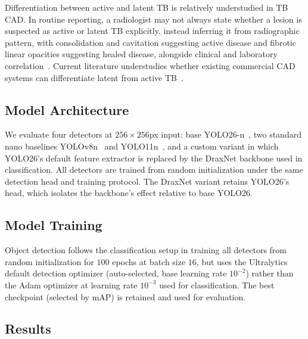 \documentclass[conference, letterpaper]{IEEEtran}
\begin{document}
Differentiation between active and latent TB is relatively understudied in TB CAD. In routine reporting, a radiologist may not always state whether a lesion is suspected as active or latent TB explicitly, instead inferring it from radiographic pattern, with consolidation and cavitation suggesting active disease and fibrotic linear opacities suggesting healed disease, alongside clinical and laboratory correlation~\cite{burrill2007tb_radiology}. Current literature understudies whether existing commercial CAD systems can differentiate latent from active TB~\cite{stoptb_cad_guide}.

\subsection{Model Architecture}

We evaluate four detectors at $256\times256$px input: base YOLO26-n~\cite{yolo26}, two standard nano baselines YOLOv8n~\cite{yolov8} and YOLO11n~\cite{yolo11}, and a custom variant in which YOLO26's default feature extractor is replaced by the DraxNet backbone used in classification. All detectors are trained from random initialization under the same detection head and training protocol. The DraxNet variant retains YOLO26's head, which isolates the backbone's effect relative to base YOLO26.

\subsection{Model Training}

Object detection follows the classification setup in training all detectors from random initialization for $100$ epochs at batch size $16$, but uses the Ultralytics default detection optimizer (auto-selected, base learning rate $10^{-2}$) rather than the Adam optimizer at learning rate $10^{-3}$ used for classification. The best checkpoint (selected by mAP) is retained and used for evaluation.

\subsection{Results}
\end{document}
